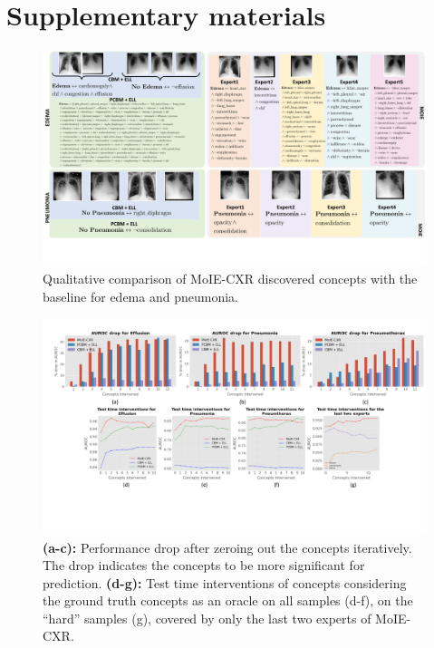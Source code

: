 \newpage
\section*{Supplementary materials}
\begin{figure}[h]
\begin{center}
\centerline{\includegraphics[width=\linewidth]{plots/supp/Supp_qual.pdf}}
\caption{Qualitative comparison of MoIE-CXR discovered concepts with the baseline for edema and pneumonia.}
\label{fig:expert_performance_cv_vit}
\end{center}
\end{figure}

\begin{figure}[h]
\begin{center}
\centerline{\includegraphics[width=\linewidth]{plots/supp/Supp_Quant_concepts.pdf}}
\caption{\textbf{(a-c):} Performance drop after zeroing out the concepts iteratively. The drop indicates the concepts to be more significant for prediction. \textbf{(d-g):} Test time interventions of concepts considering the ground truth concepts as an oracle on all samples (d-f), on the ``hard'' samples (g), covered by only the last two experts of MoIE-CXR.}
\label{fig:expert_performance_cv_vit}
\end{center}
\end{figure}

